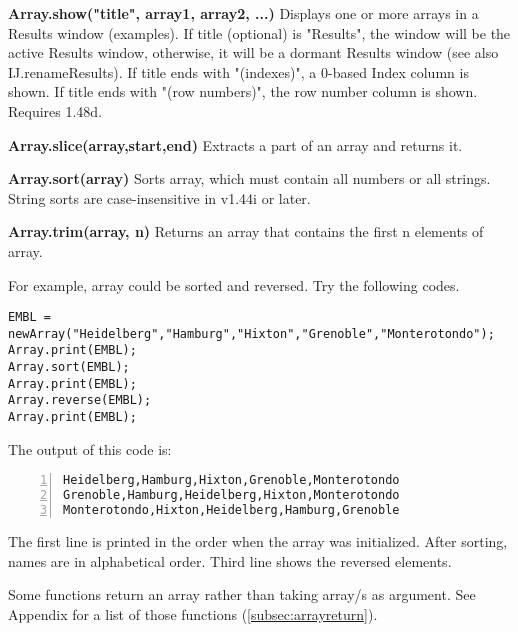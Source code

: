 \begin{shaded}
\begin{indentCom}
\item \textbf{Array.show("title", array1, array2, ...)} Displays one or more arrays in a Results window (examples). If title (optional) is "Results", the window will be the active Results window, otherwise, it will be a dormant Results window (see also IJ.renameResults). If title ends with "(indexes)", a 0-based Index column is shown. If title ends with "(row numbers)", the row number column is shown. Requires 1.48d. 
\item \textbf{Array.slice(array,start,end)} Extracts a part of an array and
returns it. 
\item \textbf{Array.sort(array)} Sorts array, which must contain all numbers
or all strings. String sorts are case-insensitive in v1.44i or later.
\item \textbf{Array.trim(array, n)} Returns an array that contains the first n
elements of array.
\end{indentCom}\end{shaded}

For example, array could be sorted and reversed. Try the following codes. 

\begin{lstlisting}[numbers=none]
EMBL = newArray("Heidelberg","Hamburg","Hixton","Grenoble","Monterotondo");
Array.print(EMBL);
Array.sort(EMBL);
Array.print(EMBL);
Array.reverse(EMBL);
Array.print(EMBL);
\end{lstlisting} 
The output of this code is:
\begin{lstlisting}[numbers=left]
Heidelberg,Hamburg,Hixton,Grenoble,Monterotondo
Grenoble,Hamburg,Heidelberg,Hixton,Monterotondo
Monterotondo,Hixton,Heidelberg,Hamburg,Grenoble
\end{lstlisting} 
The first line is printed in the order when the array was initialized. After
sorting, names are in alphabetical order. Third line shows the reversed
elements. 

Some functions return an array rather than taking array/s as argument. See Appendix for a list of those functions (\ref{subsec:arrayreturn}).
